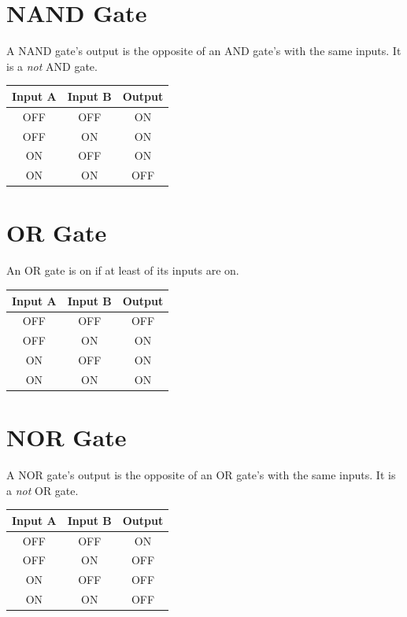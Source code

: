 \documentclass[12pt]{book}
\newcommand{\ON}{\textcolor{on}{ON}}
\newcommand{\OFF}{\textcolor{off}{OFF}}
\begin{document}
		\section{NAND Gate}
			A NAND gate's output is the opposite of an AND gate's with the same inputs. It is a \emph{not} AND gate.
			\begin{center}
				\begin{tabular}{|c|c|c|}
					\hline
					\textbf{Input A} & \textbf{Input B} & \textbf{Output}\\\hline
					\OFF & \OFF & \ON\\\hline
					\OFF & \ON & \ON\\\hline
					\ON & \OFF & \ON\\\hline
					\ON & \ON & \OFF\\\hline
				\end{tabular}
			\end{center}
		\section{OR Gate}
			An OR gate is on if at least of its inputs are on.
			\begin{center}
				\begin{tabular}{|c|c|c|}
					\hline
					\textbf{Input A} & \textbf{Input B} & \textbf{Output}\\\hline
					\OFF & \OFF & \OFF\\\hline
					\OFF & \ON & \ON\\\hline
					\ON & \OFF & \ON\\\hline
					\ON & \ON & \ON\\\hline
				\end{tabular}
			\end{center}
		\section{NOR Gate}
			A NOR gate's output is the opposite of an OR gate's with the same inputs. It is a \emph{not} OR gate.
			\begin{center}
				\begin{tabular}{|c|c|c|}
					\hline
					\textbf{Input A} & \textbf{Input B} & \textbf{Output}\\\hline
					\OFF & \OFF & \ON\\\hline
					\OFF & \ON & \OFF\\\hline
					\ON & \OFF & \OFF\\\hline
					\ON & \ON & \OFF\\\hline
				\end{tabular}
			\end{center}
\end{document}
